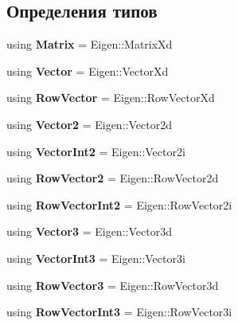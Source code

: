 \subsection*{Определения типов}
\begin{DoxyCompactItemize}
\item 
\hypertarget{namespace_math_a20679a74232d910c29bec6c443fae428}{}\label{namespace_math_a20679a74232d910c29bec6c443fae428} 
using {\bfseries Matrix} = Eigen\+::\+Matrix\+Xd
\item 
\hypertarget{namespace_math_aa19579150aa3450d96cf05232e95c7d0}{}\label{namespace_math_aa19579150aa3450d96cf05232e95c7d0} 
using {\bfseries Vector} = Eigen\+::\+Vector\+Xd
\item 
\hypertarget{namespace_math_a5a5c543ecc4a5c3cf8fc42bb2b814e92}{}\label{namespace_math_a5a5c543ecc4a5c3cf8fc42bb2b814e92} 
using {\bfseries Row\+Vector} = Eigen\+::\+Row\+Vector\+Xd
\item 
\hypertarget{namespace_math_a829dcabcf6c01e2f7a8e592f6df39595}{}\label{namespace_math_a829dcabcf6c01e2f7a8e592f6df39595} 
using {\bfseries Vector2} = Eigen\+::\+Vector2d
\item 
\hypertarget{namespace_math_a04a70f9be53a2317bed18efb51bd10e0}{}\label{namespace_math_a04a70f9be53a2317bed18efb51bd10e0} 
using {\bfseries Vector\+Int2} = Eigen\+::\+Vector2i
\item 
\hypertarget{namespace_math_a5957cc0bbedd7dca439cf843a91f9572}{}\label{namespace_math_a5957cc0bbedd7dca439cf843a91f9572} 
using {\bfseries Row\+Vector2} = Eigen\+::\+Row\+Vector2d
\item 
\hypertarget{namespace_math_a94c905a0f42efd8189bf204369de9761}{}\label{namespace_math_a94c905a0f42efd8189bf204369de9761} 
using {\bfseries Row\+Vector\+Int2} = Eigen\+::\+Row\+Vector2i
\item 
\hypertarget{namespace_math_acbf8101054f0439edce3f14dbe76ed36}{}\label{namespace_math_acbf8101054f0439edce3f14dbe76ed36} 
using {\bfseries Vector3} = Eigen\+::\+Vector3d
\item 
\hypertarget{namespace_math_ac67068e5789993d8bd02af01a4f2701b}{}\label{namespace_math_ac67068e5789993d8bd02af01a4f2701b} 
using {\bfseries Vector\+Int3} = Eigen\+::\+Vector3i
\item 
\hypertarget{namespace_math_abf6a25b9fd91fec597fc5c822ac94ca7}{}\label{namespace_math_abf6a25b9fd91fec597fc5c822ac94ca7} 
using {\bfseries Row\+Vector3} = Eigen\+::\+Row\+Vector3d
\item 
\hypertarget{namespace_math_a35e6cbc8f1896dd8188cb58db1464308}{}\label{namespace_math_a35e6cbc8f1896dd8188cb58db1464308} 
using {\bfseries Row\+Vector\+Int3} = Eigen\+::\+Row\+Vector3i
\end{DoxyCompactItemize}
